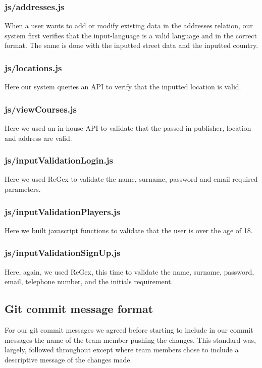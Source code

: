 \documentclass[titlepage]{article}
\begin{document}
\subsubsection{js/addresses.js}
When a user wants to add or modify existing data in the addresses relation, our system first verifies that the
input-language is a valid language and in the correct format. The same is done with the inputted street data
and the inputted country.

\subsubsection{js/locations.js}
Here our system queries an API to verify that the inputted location is valid.

\subsubsection{js/viewCourses.js}
Here we used an in-house API to validate that the passed-in publisher, location and address are valid.

\subsubsection{js/inputValidationLogin.js}
Here we used ReGex to validate the name, surname, password and email required parameters.

\subsubsection{js/inputValidationPlayers.js}
Here we built javascript functions to validate that the user is over the age of 18. 

\subsubsection{js/inputValidationSignUp.js}
Here, again, we used ReGex, this time to validate the name, surname, password, email, telephone number,
and the initials requirement.

\subsection{Git commit message format}
For our git commit messages we agreed before starting to include in our commit messages the name of the team member
pushing the changes. This standard was, largely, followed throughout except where team members chose to include
a descriptive message of the changes made.
\end{document}

